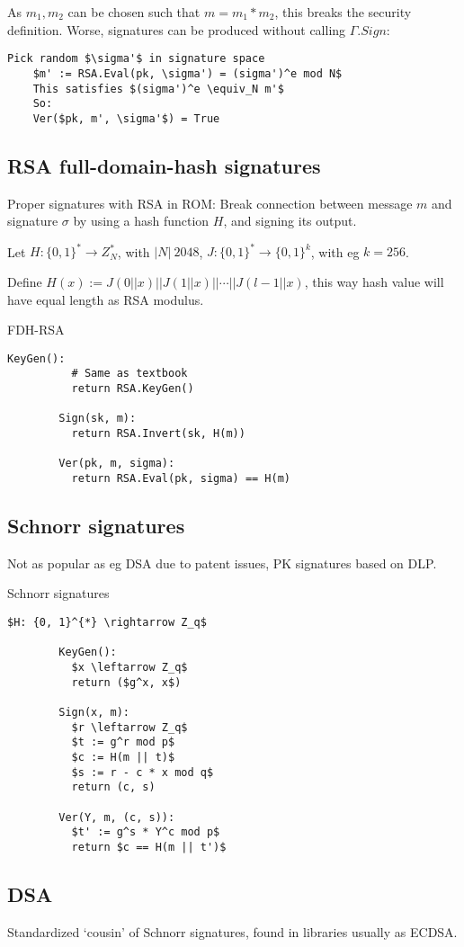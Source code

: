 \documentclass[a4paper]{scrreprt}
\begin{document}
As $m_1, m_2$ can be chosen such that $m = m_1 * m_2$, this breaks the security definition. Worse, signatures can be produced without calling $\Gamma.Sign$: 

\begin{lstlisting}[mathescape=true,autogobble=true]
	Pick random $\sigma'$ in signature space
	$m' := RSA.Eval(pk, \sigma') = (sigma')^e mod N$
	This satisfies $(sigma')^e \equiv_N m'$
	So:
	Ver($pk, m', \sigma'$) = True
\end{lstlisting}

\subsection{RSA full-domain-hash signatures}

Proper signatures with RSA in ROM: Break connection between message $m$ and
signature $\sigma$ by using a hash function $H$, and signing its output.

Let $H: \{0, 1\}^{*} \rightarrow Z_N^{*}$, with $|N| ~ 2048$, $J: \{0, 1\}^{*}
\rightarrow \{0, 1\}^k$, with eg $k = 256$.

Define $H(x) := J(0 || x) || J(1 || x) || \cdots || J(l - 1 || x)$, this way
hash value will have equal length as RSA modulus.

\begin{library}{FDH-RSA}
	\begin{lstlisting}[mathescape=true,autogobble=true]
		KeyGen():
		  # Same as textbook
		  return RSA.KeyGen()

		Sign(sk, m):
		  return RSA.Invert(sk, H(m))

		Ver(pk, m, sigma):
		  return RSA.Eval(pk, sigma) == H(m)
	\end{lstlisting}
\end{library}


\subsection{Schnorr signatures}

Not as popular as eg DSA due to patent issues, PK signatures based on DLP.

\begin{library}{Schnorr signatures}
	\begin{lstlisting}[mathescape=true,autogobble=true]
		$H: {0, 1}^{*} \rightarrow Z_q$

		KeyGen():
		  $x \leftarrow Z_q$
		  return ($g^x, x$)

		Sign(x, m):
		  $r \leftarrow Z_q$
		  $t := g^r mod p$
		  $c := H(m || t)$
		  $s := r - c * x mod q$
		  return (c, s)

		Ver(Y, m, (c, s)):
		  $t' := g^s * Y^c mod p$
		  return $c == H(m || t')$
	\end{lstlisting}
\end{library}

\subsection{DSA}

Standardized `cousin' of Schnorr signatures, found in libraries usually as
ECDSA.
\end{document}

